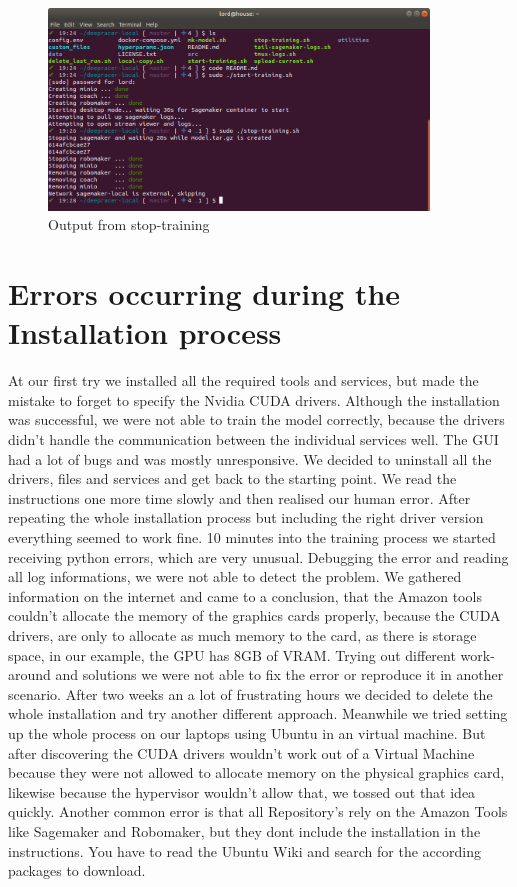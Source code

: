 \begin{figure}[H]
    \centering
    \includegraphics[width=0.9\textwidth]{images/deepracer_local_training_stop.png}
    \caption[]{Output from stop-training\footnotemark}
    \label{fig:console-output-stop}
\end{figure}

\section{Errors occurring during the Installation process}
At our first try we installed all the required tools and services, but made the mistake to forget to specify the Nvidia CUDA drivers. Although the installation was successful, we were not able to train the model correctly, because the drivers didn't handle the communication between the individual services well. The GUI had a lot of bugs and was mostly unresponsive. We decided to uninstall all the drivers, files and services and get back to the starting point. We read the instructions one more time slowly and then realised our human error. After repeating the whole installation process but including the right driver version everything seemed to work fine. 10 minutes into the training process we started receiving python errors, which are very unusual. Debugging the error and reading all log informations, we were not able to detect the problem. We gathered information on the internet and came to a conclusion, that the Amazon tools couldn't allocate the memory of the graphics cards properly, because the CUDA drivers, are only to allocate as much memory to the card, as there is storage space, in our example, the GPU has 8GB of VRAM. Trying out different work-around and solutions we were not able to fix the error or reproduce it in another scenario. After two weeks an a lot of frustrating hours we decided to delete the whole installation and try another different approach. \newline Meanwhile we tried setting up the whole process on our laptops using Ubuntu in an virtual machine. But after discovering the CUDA drivers wouldn't work out of a Virtual Machine because they were not allowed to allocate memory on the physical graphics card, likewise because the hypervisor wouldn't allow that, we tossed out that idea quickly. \newline Another common error is that all Repository's rely on the Amazon Tools like Sagemaker and Robomaker, but they dont include the installation in the instructions. You have to read the Ubuntu Wiki and search for the according packages to download.


